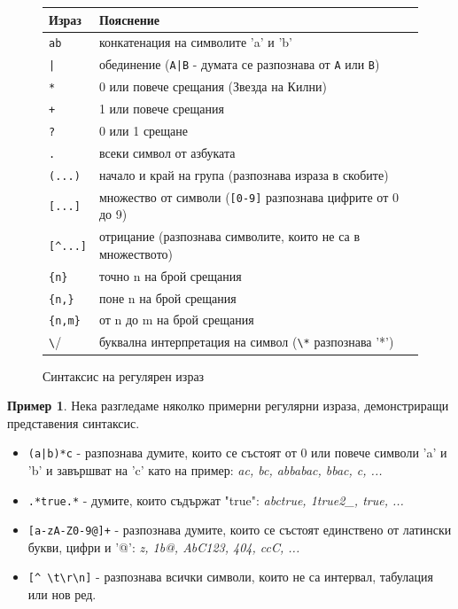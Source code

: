 \documentclass[12pt, oneside]{article}
\theoremstyle{definition}
\newtheorem{example}{Пример}[section]
\begin{document}
\begin{figure}[!htb]
	\begin{center}
		\begin{tabular}{ |l|l| } 
		\hline
		Израз & Пояснение \\
		\hline
		\verb/ab/ & конкатенация на символите 'a' и 'b' \\
		\verb/|/ & обединение (\verb/A|B/ - думата се разпознава от \verb/A/ или \verb/B/) \\
		\verb/*/ & 0 или повече срещания (Звезда на Килни) \\
		\verb/+/ & 1 или повече срещания \\
		\verb/?/ & 0 или 1 срещане \\
		\verb/./ & всеки символ от азбуката \\
		\verb/(...)/ & начало и край на група (разпознава израза в скобите) \\
		\verb/[...]/ & множество от символи (\verb/[0-9]/ разпознава цифрите от 0 до 9) \\
		\verb/[^...]/ & отрицание (разпознава символите, които не са в множеството) \\
		\verb/{n}/ & точно n на брой срещания \\
		\verb/{n,}/ & поне n на брой срещания \\
		\verb/{n,m}/ & от n до m на брой срещания \\
		\verb/\/ & буквална интерпретация на символ (\verb/\*/ разпознава '*') \\
		\hline
		\end{tabular}
	\end{center}
	\label{fig:RegExSyntax}
	\caption{Синтаксис на регулярен израз}
\end{figure}

\begin{example}
	Нека разгледаме няколко примерни регулярни израза, демонстриращи представения синтаксис.
	\begin{itemize}
		\item \verb/(a|b)*c/ - разпознава думите, които се състоят от 0 или повече символи 'a' и 'b' и завършват на 'c' като на пример: \emph{ac, bc, abbabac, bbac, c, ...}
		\item \verb/.*true.*/ - думите, които съдържат "true": \emph{abctrue, 1true2_, true, ...}
		\item \verb/[a-zA-Z0-9@]+/ - разпознава думите, които се състоят единствено от латински букви, цифри и '@': \emph{z, 1b@, AbC123, 404, ccC, ...}
		\item \verb/[^ \t\r\n]/ - разпознава всички символи, които не са интервал, табулация или нов ред.
	\end{itemize}
\end{example}
\end{document}
